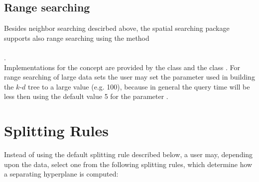 \subsection{Range searching}

Besides neighbor searching descirbed above, the spatial searching package
supports also range searching using the method \\
 \\
.\\
Implementations for the concept  are provided by
the class   
and the class . 
For range searching of large data sets the user may set the parameter  
used in building the $k$-$d$ tree to a large value (e.g. 100), 
because in general the query time will be less then using the default value 5 for the parameter .


\section{Splitting Rules}
\label{Spatial_Searching:Splitting_rule_section}

Instead of using the default splitting rule  described below,
a user may, depending upon the data, select 
one from the following splitting rules,
which determine how a separating hyperplane is computed:

